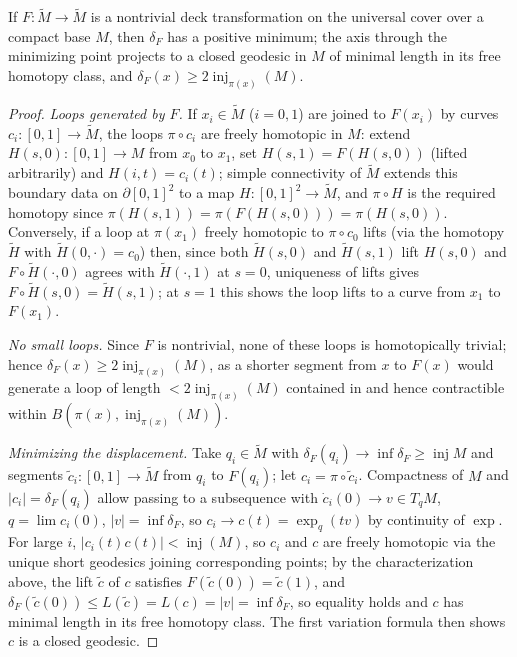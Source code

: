 \begin{lemma}[Lemma 6.2.8]
  \label{lem:pet-ch6-deck-transformation-dilation}
  If $F:\tilde M\to\tilde M$ is a nontrivial deck transformation on the
  universal cover over a compact base $M$, then $\delta_F$ has a positive
  minimum; the axis through the minimizing point projects to a closed
  geodesic in $M$ of minimal length in its free homotopy class, and
  $\delta_F(x)\ge2\operatorname{inj}_{\pi(x)}(M)$.
\end{lemma}
\begin{proof}
  \emph{Loops generated by $F$.} If $x_i\in\tilde M$ ($i=0,1$) are joined to
  $F(x_i)$ by curves $c_i:[0,1]\to\tilde M$, the loops $\pi\circ c_i$ are
  freely homotopic in $M$: extend $H(s,0):[0,1]\to M$ from $x_0$ to $x_1$,
  set $H(s,1)=F(H(s,0))$ (lifted arbitrarily) and $H(i,t)=c_i(t)$; simple
  connectivity of $\tilde M$ extends this boundary data on $\partial[0,1]^2$
  to a map $H:[0,1]^2\to\tilde M$, and $\pi\circ H$ is the required homotopy
  since $\pi(H(s,1))=\pi(F(H(s,0)))=\pi(H(s,0))$. Conversely, if a loop at
  $\pi(x_1)$ freely homotopic to $\pi\circ c_0$ lifts (via the homotopy
  $\tilde H$ with $\tilde H(0,\cdot)=c_0$) then, since both $\tilde H(s,0)$
  and $\tilde H(s,1)$ lift $H(s,0)$ and $F\circ\tilde H(\cdot,0)$ agrees with
  $\tilde H(\cdot,1)$ at $s=0$, uniqueness of lifts gives
  $F\circ\tilde H(s,0)=\tilde H(s,1)$; at $s=1$ this shows the loop lifts to a
  curve from $x_1$ to $F(x_1)$.

  \emph{No small loops.} Since $F$ is nontrivial, none of these loops is
  homotopically trivial; hence $\delta_F(x)\ge2\operatorname{inj}_{\pi(x)}(M)$, as a
  shorter segment from $x$ to $F(x)$ would generate a loop of length
  $<2\operatorname{inj}_{\pi(x)}(M)$ contained in and hence contractible within
  $B(\pi(x),\operatorname{inj}_{\pi(x)}(M))$.

  \emph{Minimizing the displacement.} Take $q_i\in\tilde M$ with
  $\delta_F(q_i)\to\inf\delta_F\ge\operatorname{inj}M$ and segments
  $\tilde c_i:[0,1]\to\tilde M$ from $q_i$ to $F(q_i)$; let
  $c_i=\pi\circ\tilde c_i$. Compactness of $M$ and $|c_i|=\delta_F(q_i)$ allow
  passing to a subsequence with $\dot c_i(0)\to v\in T_qM$, $q=\lim c_i(0)$,
  $|v|=\inf\delta_F$, so $c_i\to c(t)=\exp_q(tv)$ by continuity of $\exp$.
  For large $i$, $|c_i(t)c(t)|<\operatorname{inj}(M)$, so $c_i$ and $c$ are freely
  homotopic via the unique short geodesics joining corresponding points; by
  the characterization above, the lift $\tilde c$ of $c$ satisfies
  $F(\tilde c(0))=\tilde c(1)$, and
  $\delta_F(\tilde c(0))\le L(\tilde c)=L(c)=|v|=\inf\delta_F$, so equality
  holds and $c$ has minimal length in its free homotopy class. The first
  variation formula then shows $c$ is a closed geodesic.
\end{proof}

